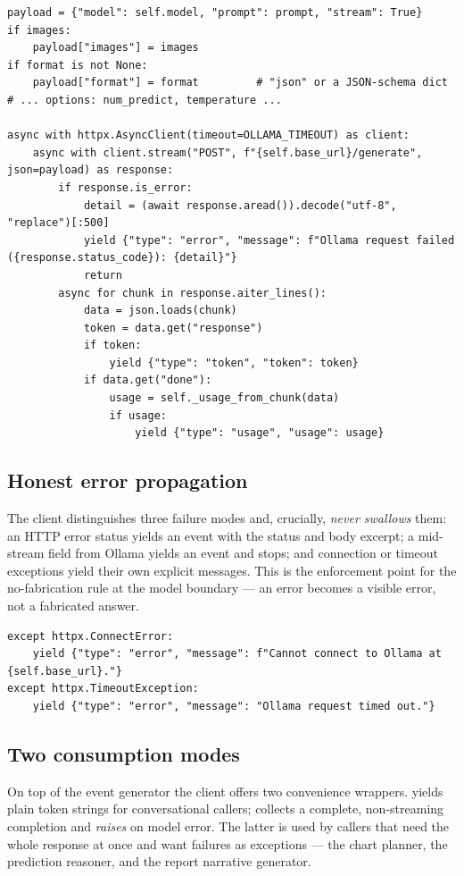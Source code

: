 \begin{lstlisting}[style=py,caption={Streaming request construction and per-line event emission.}]
payload = {"model": self.model, "prompt": prompt, "stream": True}
if images:
    payload["images"] = images
if format is not None:
    payload["format"] = format         # "json" or a JSON-schema dict
# ... options: num_predict, temperature ...

async with httpx.AsyncClient(timeout=OLLAMA_TIMEOUT) as client:
    async with client.stream("POST", f"{self.base_url}/generate", json=payload) as response:
        if response.is_error:
            detail = (await response.aread()).decode("utf-8", "replace")[:500]
            yield {"type": "error", "message": f"Ollama request failed ({response.status_code}): {detail}"}
            return
        async for chunk in response.aiter_lines():
            data = json.loads(chunk)
            token = data.get("response")
            if token:
                yield {"type": "token", "token": token}
            if data.get("done"):
                usage = self._usage_from_chunk(data)
                if usage:
                    yield {"type": "usage", "usage": usage}
\end{lstlisting}

\subsection{Honest error propagation}
The client distinguishes three failure modes and, crucially, \emph{never
swallows} them: an HTTP error status yields an  event with the
status and body excerpt; a mid-stream  field from Ollama yields an
 event and stops; and connection or timeout exceptions yield their
own explicit messages. This is the enforcement point for the no-fabrication rule
at the model boundary --- an error becomes a visible error, not a fabricated
answer.

\begin{lstlisting}[style=py,caption={Connection and timeout errors surface as real events.}]
except httpx.ConnectError:
    yield {"type": "error", "message": f"Cannot connect to Ollama at {self.base_url}."}
except httpx.TimeoutException:
    yield {"type": "error", "message": "Ollama request timed out."}
\end{lstlisting}

\subsection{Two consumption modes}
On top of the event generator the client offers two convenience wrappers.
 yields plain token strings for conversational callers;
 collects a complete, non-streaming completion and
\emph{raises} on model error. The latter is used by callers that need the whole
response at once and want failures as exceptions --- the chart planner, the
prediction reasoner, and the report narrative generator.

